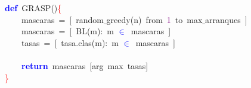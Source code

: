 \noindent
\mbox{}\textbf{\textcolor{Blue}{def}}\ GRASP\textcolor{BrickRed}{()}\textcolor{Red}{\{} \\
\mbox{}\ \ \ \ mascaras\ \textcolor{BrickRed}{=}\ \textcolor{BrickRed}{[}\ random$\_$greedy\textcolor{BrickRed}{(}n\textcolor{BrickRed}{)}\ from\ \textcolor{Purple}{1}\ to\ max$\_$arranques\ \textcolor{BrickRed}{]} \\
\mbox{}\ \ \ \ mascaras\ \textcolor{BrickRed}{=}\ \textcolor{BrickRed}{[}\ BL\textcolor{BrickRed}{(}m\textcolor{BrickRed}{):}\ m \textbf{\textcolor{Blue}{$\in$}}\ mascaras\ \textcolor{BrickRed}{]} \\
\mbox{}\ \ \ \ tasas\ \textcolor{BrickRed}{=}\ \textcolor{BrickRed}{[}\ tasa\textcolor{BrickRed}{.}clas\textcolor{BrickRed}{(}m\textcolor{BrickRed}{):}\ m \textbf{\textcolor{Blue}{$\in$}}\ mascaras\ \textcolor{BrickRed}{]} \\
\mbox{} \\
\mbox{}\ \ \ \ \textbf{\textcolor{Blue}{return}}\ mascaras\ \textcolor{BrickRed}{[}arg\ max\ tasas\textcolor{BrickRed}{]} \\
\mbox{}\textcolor{Red}{\}} \\
\mbox{}

